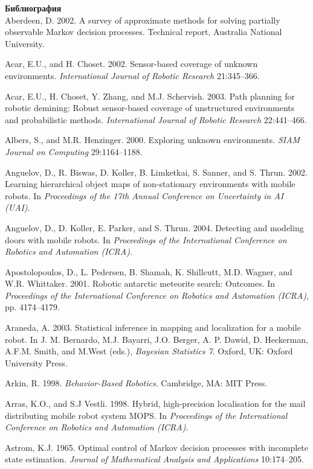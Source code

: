 \documentclass[10pt,a4paper]{article}
\begin{document}
\textbf{Библиография}\\

Aberdeen, D. 2002. A survey of approximate methods for solving partially observable
Markov decision processes. Technical report, Australia National University.

Acar, E.U., and H. Choset. 2002. Sensor-based coverage of unknown environments.
\textit{International Journal of Robotic Research} 21:345–366.

Acar, E.U., H. Choset, Y. Zhang, and M.J. Schervish. 2003. Path planning for robotic
demining: Robust sensor-based coverage of unstructured environments and probabilistic
methods. \textit{International Journal of Robotic Research} 22:441–466.

Albers, S., and M.R. Henzinger. 2000. Exploring unknown environments. \textit{SIAM
Journal on Computing} 29:1164–1188.

Anguelov, D., R. Biswas, D. Koller, B. Limketkai, S. Sanner, and S. Thrun. 2002. Learning
hierarchical object maps of non-stationary environments with mobile robots. In
\textit{Proceedings of the 17th Annual Conference on Uncertainty in AI (UAI)}.

Anguelov, D., D. Koller, E. Parker, and S. Thrun. 2004. Detecting and modeling doors
with mobile robots. In \textit{Proceedings of the International Conference on Robotics and
Automation (ICRA)}.

Apostolopoulos, D., L. Pedersen, B. Shamah, K. Shillcutt, M.D. Wagner, and W.R.
Whittaker. 2001. Robotic antarctic meteorite search: Outcomes. In \textit{Proceedings of
the International Conference on Robotics and Automation (ICRA)}, pp. 4174–4179.

Araneda, A. 2003. Statistical inference in mapping and localization for a mobile
robot. In J. M. Bernardo, M.J. Bayarri, J.O. Berger, A. P. Dawid, D. Heckerman,
A.F.M. Smith, and M.West (eds.), \textit{Bayesian Statistics 7}. Oxford, UK: Oxford University
Press.

Arkin, R. 1998. \textit{Behavior-Based Robotics}. Cambridge, MA: MIT Press.

Arras, K.O., and S.J Vestli. 1998. Hybrid, high-precision localisation for the mail distributing
mobile robot system MOPS. In \textit{Proceedings of the International Conference
on Robotics and Automation (ICRA)}.

Astrom, K.J. 1965. Optimal control of Markov decision processes with incomplete
state estimation. \textit{Journal of Mathematical Analysis and Applications} 10:174–205.
\end{document}
